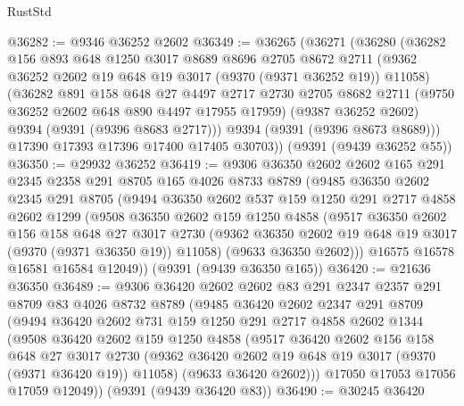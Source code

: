 \begin{lexlean}{RustStd}
\begin{coremodule}
@36282 := @9346 @36252 @2602
@36349 := @36265
    (@36271
      (@36280
        (@36282
          @156
          @893
          @648
          @1250
          @3017
          @8689
          @8696
          @2705
          @8672
          @2711
          (@9362 @36252 @2602 @19 @648 @19 @3017 (@9370 (@9371 @36252 @19)) @11058)
          (@36282
            @891
            @158
            @648
            @27
            @4497
            @2717
            @2730
            @2705
            @8682
            @2711
            (@9750 @36252 @2602 @648 @890 @4497 @17955 @17959)
            (@9387 @36252 @2602)
            @9394
            (@9391 (@9396 @8683 @2717)))
          @9394
          (@9391 (@9396 @8673 @8689)))
        @17390
        @17393
        @17396
        @17400
        @17405
        @30703))
    (@9391 (@9439 @36252 @55))
@36350 := @29932 @36252
@36419 := @9306
    @36350
    @2602
    @2602
    @165
    @291
    @2345
    @2358
    @291
    @8705
    @165
    @4026
    @8733
    @8789
    (@9485
      @36350
      @2602
      @2345
      @291
      @8705
      (@9494
        @36350
        @2602
        @537
        @159
        @1250
        @291
        @2717
        @4858
        @2602
        @1299
        (@9508
          @36350
          @2602
          @159
          @1250
          @4858
          (@9517
            @36350
            @2602
            @156
            @158
            @648
            @27
            @3017
            @2730
            (@9362 @36350 @2602 @19 @648 @19 @3017 (@9370 (@9371 @36350 @19)) @11058)
            (@9633 @36350 @2602)))
        @16575
        @16578
        @16581
        @16584
        @12049))
    (@9391 (@9439 @36350 @165))
@36420 := @21636 @36350
@36489 := @9306
    @36420
    @2602
    @2602
    @83
    @291
    @2347
    @2357
    @291
    @8709
    @83
    @4026
    @8732
    @8789
    (@9485
      @36420
      @2602
      @2347
      @291
      @8709
      (@9494
        @36420
        @2602
        @731
        @159
        @1250
        @291
        @2717
        @4858
        @2602
        @1344
        (@9508
          @36420
          @2602
          @159
          @1250
          @4858
          (@9517
            @36420
            @2602
            @156
            @158
            @648
            @27
            @3017
            @2730
            (@9362 @36420 @2602 @19 @648 @19 @3017 (@9370 (@9371 @36420 @19)) @11058)
            (@9633 @36420 @2602)))
        @17050
        @17053
        @17056
        @17059
        @12049))
    (@9391 (@9439 @36420 @83))
@36490 := @30245 @36420

\end{coremodule}
\end{lexlean}

